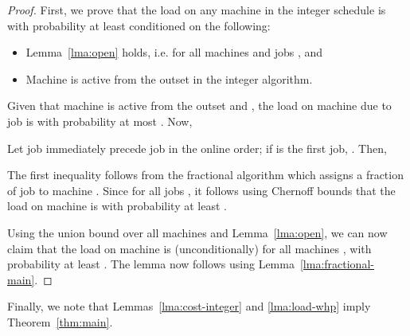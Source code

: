 \documentclass[11pt]{article}
\begin{document}
\begin{proof}
First, we prove that the load on any machine in the integer schedule is 
 with probability at least 
conditioned on the following:
\begin{itemize} 
\item Lemma~\ref{lma:open} holds, i.e.  for all machines  and
jobs , and
\item Machine  is active from the outset in the integer algorithm.
\end{itemize}
Given that machine  is active from the outset and , 
the load on machine  due to job  is  with probability at most . 
Now,

Let job  immediately precede job  in the online order; if  is the first job,
. Then,

The first inequality follows from the fractional algorithm which assigns a 
fraction  of job  to machine .
Since  for all jobs , it follows using 
Chernoff bounds that the load on machine  is 
 with probability at least .

Using the union bound over all machines and Lemma~\ref{lma:open},
we can now claim that the load on machine  is 
 (unconditionally) for all machines ,
with probability at least . 
The lemma now follows using Lemma~\ref{lma:fractional-main}.
\end{proof}
\noindent
Finally, we note that Lemmas~\ref{lma:cost-integer} and \ref{lma:load-whp} imply 
Theorem~\ref{thm:main}.

\newpage



\end{document}
